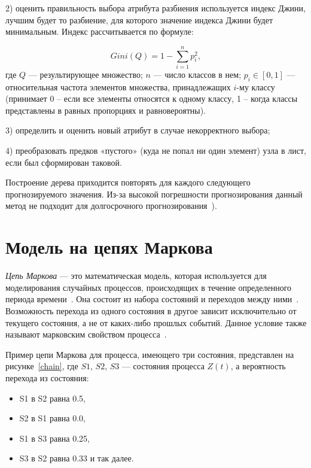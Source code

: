 2) оценить правильность выбора атрибута разбиения используется индекс Джини, лучшим будет то разбиение,
для которого значение индекса Джини будет минимальным.
Индекс рассчитывается по формуле:

\begin{equation}
    Gini(Q)=1-\sum_{i=1} ^{n} p_i^2,
\end{equation}
где $Q$ --- результирующее множество;
$n$ --- число классов в нем;
$p_i\in[0,1]$ --- относительная частота элементов множества, принадлежащих $i$-му классу
(принимает 0 – если все элементы  относятся к одному классу,
1 – когда классы представлены в равных пропорциях и равновероятны).

3) определить и оценить новый атрибут в случае некорректного выбора;

4) преобразовать предков «пустого» (куда не попал ни один элемент) узла в лист, если был сформирован таковой.

Построение дерева приходится повторять для каждого следующего прогнозируемого значения.
Из-за высокой погрешности прогнозирования данный метод не подходит для долгосрочного прогнозирования~\cite{poliref11, poliref12, poliref13, poliref14}).

\section{Модель на цепях Маркова}

\textit{Цепь Маркова} --- это математическая модель, которая используется для моделирования случайных процессов,
происходящих в течение определенного периода времени~\cite{myref8, myref9, myref13, myref16}.
Она состоит из набора состояний и переходов между ними~\cite{myref16, myref9}.
Возможность перехода из одного состояния в другое зависит исключительно от текущего состояния, а не от каких-либо прошлых событий.
Данное условие также называют марковским свойством процесса~\cite{myref8, myref9,myref13, myref16}.

Пример цепи Маркова для процесса, имеющего три состояния, представлен на рисунке~\ref{chain}, где $S1$, $S2$, $S3$ — состояния процесса $Z(t)$,
а вероятность перехода из состояния:
\begin{itemize}
    \item S1 в S2 равна 0.5,
    \item S2 в S1 равна 0.0,
    \item S1 в S3 равна 0.25,
    \item S3 в S2 равна 0.33 и так далее.
\end{itemize}

